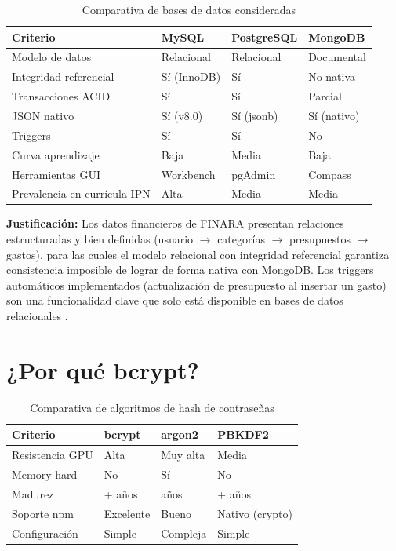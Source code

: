 \begin{longtable}{p{3.5cm} >{\centering}p{2.2cm} >{\centering}p{2.5cm} >{\centering\arraybackslash}p{3.5cm}}
  \caption{Comparativa de bases de datos consideradas}
  \label{tab:mysql-vs} \\
  \toprule
  \textbf{Criterio}      & \textbf{MySQL} & \textbf{PostgreSQL} & \textbf{MongoDB} \\
  \midrule
  Modelo de datos        & Relacional & Relacional  & Documental       \\
  Integridad referencial & Sí (InnoDB) & Sí         & No nativa        \\
  Transacciones ACID     & Sí         & Sí          & Parcial          \\
  JSON nativo            & Sí (v8.0)  & Sí (jsonb)  & Sí (nativo)      \\
  Triggers               & Sí         & Sí          & No               \\
  Curva aprendizaje      & Baja       & Media       & Baja             \\
  Herramientas GUI       & Workbench  & pgAdmin     & Compass          \\
  Prevalencia en currícula IPN & Alta & Media      & Media            \\
  \bottomrule
\end{longtable}

\textbf{Justificación:} Los datos financieros de FINARA presentan relaciones estructuradas y bien definidas (usuario $\to$ categorías $\to$ presupuestos $\to$ gastos), para las cuales el modelo relacional con integridad referencial garantiza consistencia imposible de lograr de forma nativa con MongoDB. Los triggers automáticos implementados (actualización de presupuesto al insertar un gasto) son una funcionalidad clave que solo está disponible en bases de datos relacionales \cite{mysql_docs}.

\section{¿Por qué bcrypt?}

\begin{longtable}{p{3cm} >{\centering}p{2.5cm} >{\centering}p{2.5cm} >{\centering\arraybackslash}p{4.5cm}}
  \caption{Comparativa de algoritmos de hash de contraseñas}
  \label{tab:bcrypt-vs} \\
  \toprule
  \textbf{Criterio}    & \textbf{bcrypt} & \textbf{argon2} & \textbf{PBKDF2} \\
  \midrule
  Resistencia GPU      & Alta       & Muy alta    & Media           \\
  Memory-hard          & No         & Sí          & No              \\
  Madurez              & 25+ años   & 7 años      & 20+ años        \\
  Soporte npm          & Excelente  & Bueno       & Nativo (crypto) \\
  Configuración        & Simple     & Compleja    & Simple          \\
  \bottomrule
\end{longtable}

